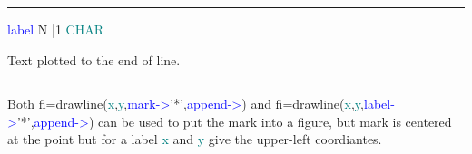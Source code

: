 \vspace{0.3cm} 
\hrule 
\vspace{0.3cm} 
\noindent \textcolor{blue}{label} \tabto{3cm}  N |1  \tabto{5cm}  \textcolor{teal}{CHAR}  \tabto{7cm} 
\begin{changemargin}{3cm}{0cm} 
\noindent  Text plotted to the end of line. 
\end {changemargin} 
\hrule 
\vspace{0.2cm} 
\begin{note} 
Both  fi=\textcolor{VioletRed}{drawline}(\textcolor{teal}{x},\textcolor{teal}{y},\textcolor{blue}{mark->}'*',\textcolor{blue}{append->}) and fi=\textcolor{VioletRed}{drawline}(\textcolor{teal}{x},\textcolor{teal}{y},\textcolor{blue}{label->}'*',\textcolor{blue}{append->}) can 
be used to put the mark into a figure, but mark is centered at the point but 
for a label \textcolor{teal}{x} and \textcolor{teal}{y} give the upper-left coordiantes. 
\end{note} 
\singlespacing 
